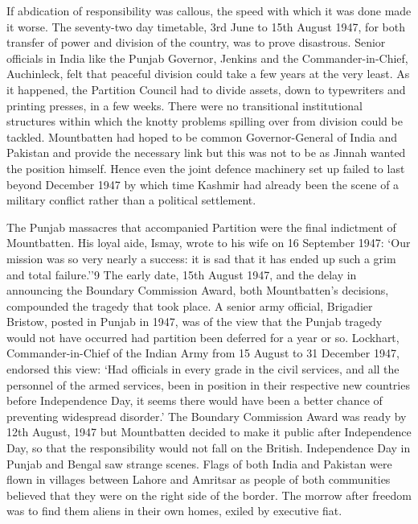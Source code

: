If abdication of responsibility was callous, the speed with which it was done made it worse. The seventy-two day timetable, 3rd June to 15th August 1947, for both transfer of power and division of the country, was to prove disastrous. Senior officials in India like the Punjab Governor, Jenkins and the Commander-in-Chief, Auchinleck, felt that peaceful division could take a few years at the very least. As it happened, the Partition Council had to divide assets, down to typewriters and printing presses, in a few weeks. There were no transitional institutional structures within which the knotty problems spilling over from division could be tackled. Mountbatten had hoped to be common Governor-General of India and Pakistan and provide the necessary link but this was not to be as Jinnah wanted the position himself. Hence even the joint defence machinery set up failed to last beyond December 1947 by which time Kashmir had already been the scene of a military conflict rather than a political settlement. 

The Punjab massacres that accompanied Partition were the final indictment of Mountbatten. His loyal aide, Ismay, wrote to his wife on 16 September 1947: `Our mission was so very nearly a success: it is sad that it has ended up such a grim and total failure.''9 The early date, 15th August 1947, and the delay in announcing the Boundary Commission Award, both Mountbatten's decisions, compounded the tragedy that took place. A senior army official, Brigadier Bristow, posted in Punjab in 1947, was of the view that the Punjab tragedy would not have occurred had partition been deferred for a year or so. Lockhart, Commander-in-Chief of the Indian Army from 15 August to 31 December 1947, endorsed this view: `Had officials in every grade in the civil services, and all the personnel of the armed services, been in position in their respective new countries before Independence Day, it seems there would have been a better chance of preventing widespread disorder.' The Boundary Commission Award was ready by 12th August, 1947 but Mountbatten decided to make it public after Independence Day, so that the responsibility would not fall on the British. Independence Day in Punjab and Bengal saw strange scenes. Flags of both India and Pakistan were flown in villages between Lahore and Amritsar as people of both communities believed that they were on the right side of the border. The morrow after freedom was to find them aliens in their own homes, exiled by executive fiat. 


